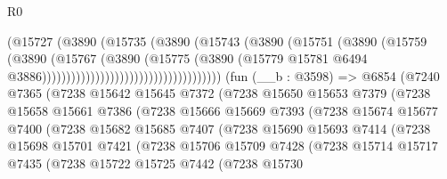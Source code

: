 \begin{lexlean}{R0}
\begin{coremodule}
                                                (@15727
                                                  (@3890
                                                    (@15735
                                                      (@3890
                                                        (@15743
                                                          (@3890
                                                            (@15751
                                                              (@3890
                                                                (@15759
                                                                  (@3890
                                                                    (@15767
                                                                      (@3890
                                                                        (@15775
                                                                          (@3890
                                                                            (@15779
                                                                              @15781
                                                                              @6494
                                                                              @3886)))))))))))))))))))))))))))))))))))))
    (fun (__b : @3598) =>
    @6854
      (@7240
        @7365
        (@7238
          @15642
          @15645
          @7372
          (@7238
            @15650
            @15653
            @7379
            (@7238
              @15658
              @15661
              @7386
              (@7238
                @15666
                @15669
                @7393
                (@7238
                  @15674
                  @15677
                  @7400
                  (@7238
                    @15682
                    @15685
                    @7407
                    (@7238
                      @15690
                      @15693
                      @7414
                      (@7238
                        @15698
                        @15701
                        @7421
                        (@7238
                          @15706
                          @15709
                          @7428
                          (@7238
                            @15714
                            @15717
                            @7435
                            (@7238
                              @15722
                              @15725
                              @7442
                              (@7238
                                @15730

\end{coremodule}
\end{lexlean}
